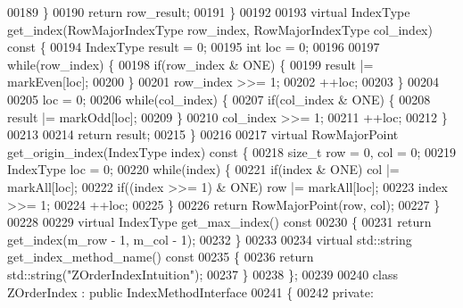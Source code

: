 \begin{DoxyCode}
00189                 \}
00190                 \textcolor{keywordflow}{return} row\_result;
00191         \}
00192 
00193         \textcolor{keyword}{virtual} IndexType get_index(RowMajorIndexType row\_index, 
      RowMajorIndexType col\_index)\textcolor{keyword}{ const }\{
00194                 IndexType result = 0;
00195                 \textcolor{keywordtype}{int} loc = 0;
00196 
00197                 \textcolor{keywordflow}{while}(row\_index) \{
00198                         \textcolor{keywordflow}{if}(row\_index & ONE) \{
00199                                 result |= markEven[loc];
00200                         \}
00201                         row\_index >>= 1;
00202                         ++loc;
00203                 \}
00204 
00205                 loc = 0;
00206                 \textcolor{keywordflow}{while}(col\_index) \{
00207                         \textcolor{keywordflow}{if}(col\_index & ONE) \{
00208                                 result |= markOdd[loc];
00209                         \}
00210                         col\_index >>= 1;
00211                         ++loc;
00212                 \}
00213 
00214                 \textcolor{keywordflow}{return} result;
00215         \}
00216 
00217         \textcolor{keyword}{virtual} RowMajorPoint get_origin_index(IndexType index)\textcolor{keyword}{ const }\{
00218                 \textcolor{keywordtype}{size\_t} row = 0, col = 0;
00219                 IndexType loc = 0;
00220                 \textcolor{keywordflow}{while}(index) \{
00221                         \textcolor{keywordflow}{if}(index & ONE) col |= markAll[loc];
00222                         \textcolor{keywordflow}{if}((index >>= 1) & ONE) row |= markAll[loc];
00223                         index >>= 1;
00224                         ++loc;
00225                 \}
00226                 \textcolor{keywordflow}{return} RowMajorPoint(row, col);
00227         \}
00228 
00229         \textcolor{keyword}{virtual} IndexType get_max_index()\textcolor{keyword}{ const}
00230 \textcolor{keyword}{        }\{
00231                 \textcolor{keywordflow}{return} get_index(m\_row - 1, m\_col - 1);
00232         \}
00233 
00234         \textcolor{keyword}{virtual} std::string get_index_method_name()\textcolor{keyword}{ const}
00235 \textcolor{keyword}{        }\{
00236                 \textcolor{keywordflow}{return} std::string(\textcolor{stringliteral}{"ZOrderIndexIntuition"});
00237         \}
00238 \};
00239 
00240 \textcolor{keyword}{class }ZOrderIndex : \textcolor{keyword}{public} IndexMethodInterface
00241 \{
00242 \textcolor{keyword}{private}:

\end{DoxyCode}
